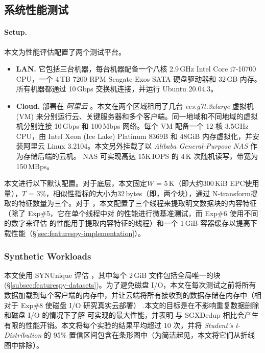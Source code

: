 \subsection{系统性能测试}
\label{subsec:featurespy-evaluation-performance}


\paragraph*{Setup.} 本文为性能评估配置了两个测试平台。

\begin{itemize}[leftmargin=*]
\item {\bf LAN.} 它包括三台机器，每台机器配备一个八核 2.9\,GHz Intel Core i7-10700 CPU，一个 4\,TB 7200 RPM Seagate Exos SATA 硬盘驱动器和 32\,GB 内存。所有机器都通过 10\,Gbps 交换机连接，并运行 Ubuntu 20.04.3。

\item {\bf Cloud.} 部署在 {\em 阿里云} \cite{Alibaba}。本文在两个区域租用了几台 {\em ecs.g7t.3xlarge} 虚拟机 (VM) 来分别运行云、关键服务器和多个客户端。同一地域和不同地域的虚拟机分别连接 10\,Gbps 和 100\,Mbps 网络。每个 VM 配备一个 12 核 3.5GHz CPU，由 Intel Xeon (Ice Lake) Platinum 8369B 和 48GiB 内存虚拟化，并安装阿里云 Linux 3.2104。本文另外挂载了以 {\em Alibaba General-Purpose NAS} 作为存储后端的云机。 NAS 可实现高达 15K\,IOPS 的 4\,K 次随机读写，带宽为 150\,MBps。
\end{itemize}

本文进行以下默认配置。对于底层\sysnameF，本文固定$W$ = 5\,K（即大约300\,KiB EPC使用量），$T$ = 3\%，相似性指标的大小为32\,bytes（即，两个块），通过 N-transform提取的特征数量为三个。对于 \prototype，本文配置了三个线程来提取明文数据块的内容特征（除了 Exp\#5，它在单个线程中对 \prototype 的性能进行微基准测试，而 Exp\#6 使用不同的数字来评估 \prototype 的性能用于提取内容特征的线程）和一个 1\,GiB 容器缓存以提高下载性能（\S\ref{sec:featurespy-implementation}）。

\subsubsection{Synthetic Workloads}
\label{subsec:featurespy-syn}
本文使用 SYNUnique 评估 \prototype，其中每个 2\,GiB 文件包括全局唯一的块 (\S\ref{subsec:featurespy-datasets})。为了避免磁盘 I/O，本文在每次测试之前将所有数据加载到每个客户端的内存中，并让云端将所有接收到的数据存储在内存中（相对于 Exp\#8 使磁盘 I/O 研究真实云部署） .本文的目标是在不影响重复数据删除和磁盘 I/O 的情况下了解 \prototype 可实现的最大性能，并表明 \prototype 与 SGXDedup \cite{ren21} 相比会产生有限的性能开销。本文将每个实验的结果平均超过 10 次，并将 {\em Student's t-Distribution} 的 95\% 置信区间包含在条形图中（为简洁起见，本文将它们从折线图中排除）。

